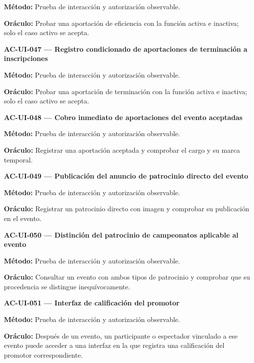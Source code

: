 \documentclass[10pt,letterpaper]{article}
\begin{document}
\textbf{Método:} Prueba de interacción y autorización observable.\par
\textbf{Oráculo:} Probar una aportación de eficiencia con la función activa e inactiva; solo el caso activo se acepta.\par\vspace{0.45em}
\noindent\textbf{AC-UI-047 --- Registro condicionado de aportaciones de terminación a inscripciones}\par
\textbf{Método:} Prueba de interacción y autorización observable.\par
\textbf{Oráculo:} Probar una aportación de terminación con la función activa e inactiva; solo el caso activo se acepta.\par\vspace{0.45em}
\noindent\textbf{AC-UI-048 --- Cobro inmediato de aportaciones del evento aceptadas}\par
\textbf{Método:} Prueba de interacción y autorización observable.\par
\textbf{Oráculo:} Registrar una aportación aceptada y comprobar el cargo y su marca temporal.\par\vspace{0.45em}
\noindent\textbf{AC-UI-049 --- Publicación del anuncio de patrocinio directo del evento}\par
\textbf{Método:} Prueba de interacción y autorización observable.\par
\textbf{Oráculo:} Registrar un patrocinio directo con imagen y comprobar su publicación en el evento.\par\vspace{0.45em}
\noindent\textbf{AC-UI-050 --- Distinción del patrocinio de campeonatos aplicable al evento}\par
\textbf{Método:} Prueba de interacción y autorización observable.\par
\textbf{Oráculo:} Consultar un evento con ambos tipos de patrocinio y comprobar que su procedencia se distingue inequívocamente.\par\vspace{0.45em}
\noindent\textbf{AC-UI-051 --- Interfaz de calificación del promotor}\par
\textbf{Método:} Prueba de interacción y autorización observable.\par
\textbf{Oráculo:} Después de un evento, un participante o espectador vinculado a ese evento puede acceder a una interfaz en la que registra una calificación del promotor correspondiente.\par\vspace{0.45em}
\end{document}
